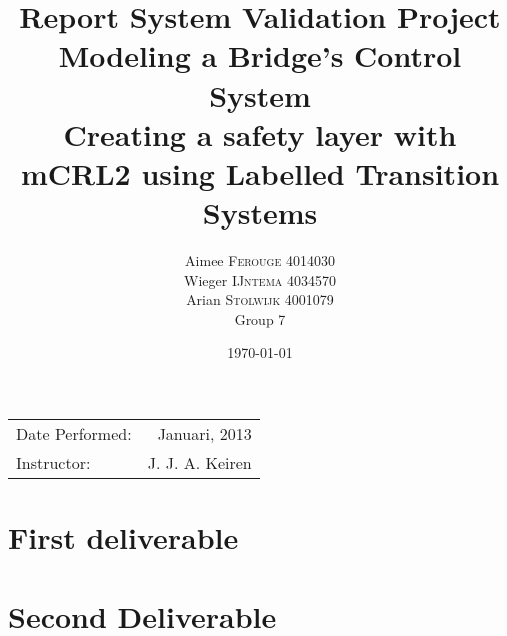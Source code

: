 \documentclass{article}
\title{Report System Validation Project \\
  Modeling a Bridge's Control System\\
  Creating a safety layer with mCRL2 using Labelled Transition Systems} %
\author{Aimee \textsc{Ferouge} 4014030 \\
  Wieger \textsc{IJntema} 4034570 \\
  Arian \textsc{Stolwijk} 4001079 \\
  Group 7} %
\date{\today} %
\begin{document}
\maketitle %

\begin{center}
\begin{tabular}{l r}
Date Performed: & Januari, 2013 \\ %
Instructor: & J. J. A. Keiren %
\end{tabular}
\end{center}




\section{First deliverable}








\section{Second Deliverable}


%
%
%
%
%
\end{document}

